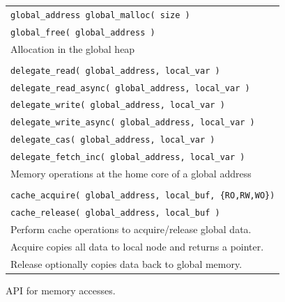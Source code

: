\begin{figure}[htbp]
  \begin{center}
    \begin{minipage}{\columnwidth}
	\small
	\begin{tabular}{l}
      	\texttt{\scriptsize global\_address global\_malloc( size )} \\
      	\texttt{\scriptsize global\_free( global\_address )} \\ 
      	Allocation in the global heap \\ \\
      	\texttt{\scriptsize delegate\_read( global\_address, local\_var )}  \\
      	\texttt{\scriptsize delegate\_read\_async( global\_address, local\_var )}  \\
      	\texttt{\scriptsize delegate\_write( global\_address, local\_var )} \\
      	\texttt{\scriptsize delegate\_write\_async( global\_address, local\_var )} \\
      	\texttt{\scriptsize delegate\_cas( global\_address, local\_var )} \\
      	\texttt{\scriptsize delegate\_fetch\_inc( global\_address, local\_var )} \\ 
      	Memory operations at the home core of a global address \\ \\
      	\texttt{\scriptsize cache\_acquire( global\_address, local\_buf, \{RO,RW,WO\})} \\
      	\texttt{\scriptsize cache\_release( global\_address, local\_buf )} \\ 
		Perform cache operations to acquire/release global data.  \\
		Acquire copies all data to local node and returns a pointer. \\ 	
		Release optionally copies data back to global memory. \\
	\end{tabular}
      \caption{\label{fig:accessing-memory} \Grappa API for memory accesses. }     \end{minipage}
  \end{center}
\end{figure}


